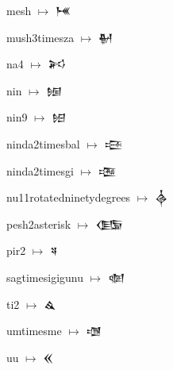 {\noindent mesh $\mapsto$ {\cufont 𒎌}\par
\noindent mush3timesza $\mapsto$ {\cufont 𒎍}\par
\noindent na4 $\mapsto$ {\cufont 𒎎}\par
\noindent nin $\mapsto$ {\cufont 𒎏}\par
\noindent nin9 $\mapsto$ {\cufont 𒎐}\par
\noindent ninda2timesbal $\mapsto$ {\cufont 𒎑}\par
\noindent ninda2timesgi $\mapsto$ {\cufont 𒎒}\par
\noindent nu11rotatedninetydegrees $\mapsto$ {\cufont 𒎓}\par
\noindent pesh2asterisk $\mapsto$ {\cufont 𒎔}\par
\noindent pir2 $\mapsto$ {\cufont 𒎕}\par
\noindent sagtimesigigunu $\mapsto$ {\cufont 𒎖}\par
\noindent ti2 $\mapsto$ {\cufont 𒎗}\par
\noindent umtimesme $\mapsto$ {\cufont 𒎘}\par
\noindent uu $\mapsto$ {\cufont 𒎙}\par
}
